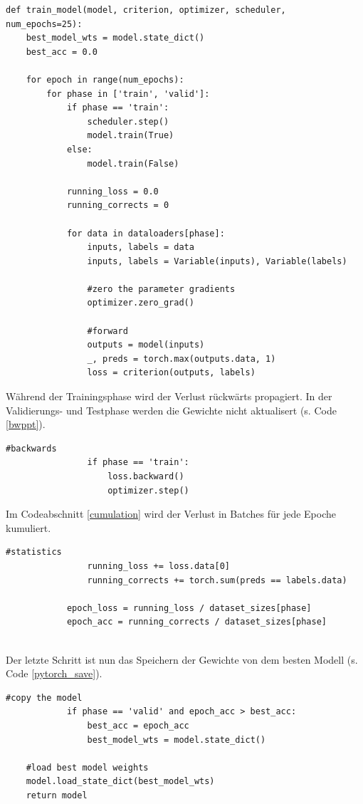 \begin{lstlisting}[caption={Berechnung der Verluste in der Training-Methode\cite{Subramanian2018}.}, label=headh_train]
def train_model(model, criterion, optimizer, scheduler, num_epochs=25):
	best_model_wts = model.state_dict()
	best_acc = 0.0
	
	for epoch in range(num_epochs):
		for phase in ['train', 'valid']:
			if phase == 'train':
				scheduler.step()
				model.train(True)
			else:
				model.train(False)
				
			running_loss = 0.0
			running_corrects = 0
			
			for data in dataloaders[phase]:
				inputs, labels = data
				inputs, labels = Variable(inputs), Variable(labels)
				
				#zero the parameter gradients
				optimizer.zero_grad()
				
				#forward
				outputs = model(inputs)
				_, preds = torch.max(outputs.data, 1)
				loss = criterion(outputs, labels)
\end{lstlisting}
Während der Trainingsphase wird der Verlust rückwärts propagiert. In der Validierungs- und Testphase werden die Gewichte nicht aktualisert (s. Code \ref{bwppt}).

\begin{lstlisting}[caption={Aktualisierung der Gewichte in der Training-Methode\cite{Subramanian2018}.}, label=bwppt]		
				#backwards
				if phase == 'train':
					loss.backward()
					optimizer.step()
\end{lstlisting}
Im Codeabschnitt \ref{cumulation} wird der Verlust in Batches für jede Epoche kumuliert.

\begin{lstlisting}[caption={Berechnung der Verluste in Batches in der Training-Methode\cite{Subramanian2018}.}, label=cumulation]					
				#statistics
				running_loss += loss.data[0]
				running_corrects += torch.sum(preds == labels.data)
			
			epoch_loss = running_loss / dataset_sizes[phase]
			epoch_acc = running_corrects / dataset_sizes[phase]
			
\end{lstlisting}
			
Der letzte Schritt ist nun das Speichern der Gewichte von dem besten Modell (s. Code \ref{pytorch_save}).
\begin{lstlisting}[caption={Festlegung des besten Modells in der Training-Methode\cite{Subramanian2018}.}, label=pytorch_save]						
			#copy the model
			if phase == 'valid' and epoch_acc > best_acc:
				best_acc = epoch_acc
				best_model_wts = model.state_dict()
	
	#load best model weights
	model.load_state_dict(best_model_wts)
	return model
\end{lstlisting}

